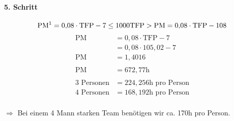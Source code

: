 \paragraph{5. Schritt}
\[\text{PM\footnotemark} = 0{,}08 \cdot \text{TFP}-7 \leq 1000\text{TFP} > \text{PM} = 0{,}08 \cdot \text{TFP}-108\]
\begin{align*}
	\text{PM} &= 0{,}08 \cdot \text{TFP} - 7 \\
			  &= 0{,}08 \cdot 105{,}02 -7\\
	\text{PM} &= 1{,}4016\\
	\\
	\text{PM} &= 672{,}77 \text{h}\\
	\\
	\text{3 Personen} &= 224{,}256\text{h pro Person}\\
	\text{4 Personen} &= 168{,}192\text{h pro Person}\\
\end{align*}

$\Rightarrow$ Bei einem 4 Mann starken Team benötigen wir ca. 170h pro Person.\\